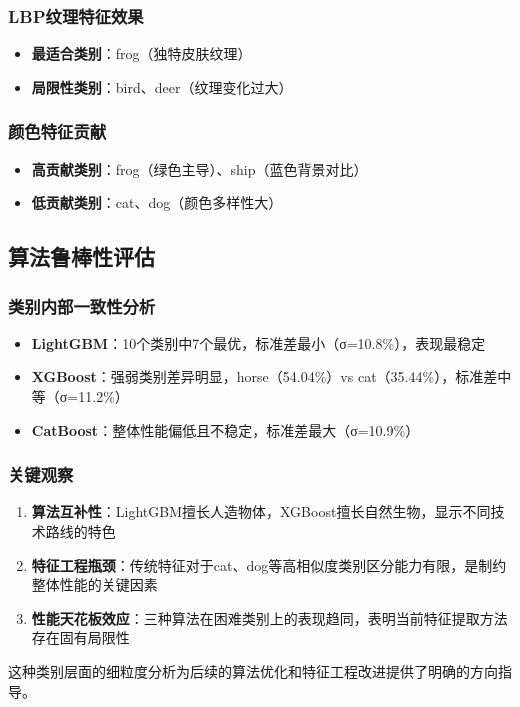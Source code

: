 \documentclass[UTF8]{report}
\theoremstyle{MyLineTheoremStyle} %
\theoremstyle{MyBlockTheoremStyle} %
\theoremstyle{MySubsubsectionStyle} %
\begin{document}
\subsubsection{LBP纹理特征效果}
\begin{itemize}
    \item \textbf{最适合类别}：frog（独特皮肤纹理）
    \item \textbf{局限性类别}：bird、deer（纹理变化过大）
\end{itemize}
\subsubsection{颜色特征贡献}
\begin{itemize}
    \item \textbf{高贡献类别}：frog（绿色主导）、ship（蓝色背景对比）
    \item \textbf{低贡献类别}：cat、dog（颜色多样性大）
\end{itemize}

\subsection{算法鲁棒性评估}
\subsubsection{类别内部一致性分析}
\begin{itemize}
    \item \textbf{LightGBM}：10个类别中7个最优，标准差最小（σ=10.8\%），表现最稳定
    \item \textbf{XGBoost}：强弱类别差异明显，horse（54.04\%）vs cat（35.44\%），标准差中等（σ=11.2\%）
    \item \textbf{CatBoost}：整体性能偏低且不稳定，标准差最大（σ=10.9\%）
\end{itemize}
\subsubsection{关键观察}
\begin{enumerate}
    \item \textbf{算法互补性}：LightGBM擅长人造物体，XGBoost擅长自然生物，显示不同技术路线的特色
    \item \textbf{特征工程瓶颈}：传统特征对于cat、dog等高相似度类别区分能力有限，是制约整体性能的关键因素
    \item \textbf{性能天花板效应}：三种算法在困难类别上的表现趋同，表明当前特征提取方法存在固有局限性
\end{enumerate}
这种类别层面的细粒度分析为后续的算法优化和特征工程改进提供了明确的方向指导。
\end{document}
